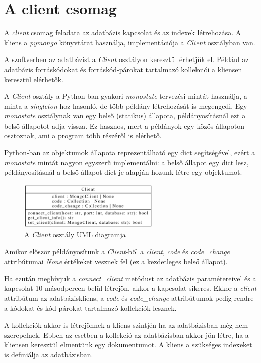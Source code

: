 \section{A client csomag}

A \emph{client} csomag feladata az adatbázis kapcsolat és az indexek létrehozása.
A kliens a \emph{pymongo} könyvtárat használja, implementációja a \emph{Client} osztályban van.

A szoftverben az adatbázist a \emph{Client} osztályon keresztül érhetjük el.
Például az adatbázis forráskódokat és forráskód-párokat tartalmazó kollekciói a kliensen
keresztül elérhetők.

A \emph{Client} osztály a Python-ban gyakori \emph{monostate} \cite{monostatePattern}
tervezési mintát használja, a minta a \emph{singleton}-hoz hasonló,
de több példány létrehozását is megengedi.
Egy \emph{monostate} osztálynak van egy belső (statikus) állapota,
példányosításnál ezt a belső állapotot adja vissza.
Ez hasznos, mert a példányok egy közös állapoton osztoznak, ami a program több részéről is elérhető.

Python-ban az objektumok állapota reprezentálható egy dict segítségével,
ezért a \emph{monostate} mintát nagyon egyszerű implementálni:
a belső állapot egy dict lesz, példányosításnál a belső állapot dict-je alapján hozunk létre egy objektumot.

\begin{figure}[H]
	\centering
	\includegraphics[width=0.6\textwidth]{images/uml/Client.eps}
	\caption{A \emph{Client} osztály UML diagramja}
\end{figure}

Amikor először példányosítunk a \emph{Client}-ből a \emph{client}, \emph{code} és \emph{code\_change}
attribútumai \emph{None} értékeket vesznek fel (ez a kezdetleges belső állapot).

Ha ezután meghívjuk a \emph{connect\_client} metódust az adatbázis paramétereivel
és a kapcsolat 10 másodpercen belül létrejön, akkor a kapcsolat sikeres.
Ekkor
a \emph{client} attribútum az adatbáziskliens,
a \emph{code} és \emph{code\_change} attribútumok pedig rendre
a kódokat és kód-párokat tartalmazó kollekciók lesznek.

A kollekciók akkor is létrejönnek a kliens szintjén ha az adatbázisban még nem szerepelnek.
Ebben az esetben a kollekció az adatbázisban akkor jön létre, ha a kliensen keresztül elmentünk egy dokumentumot.
A kliens a szükséges indexeket is definiálja az adatbázisban.

